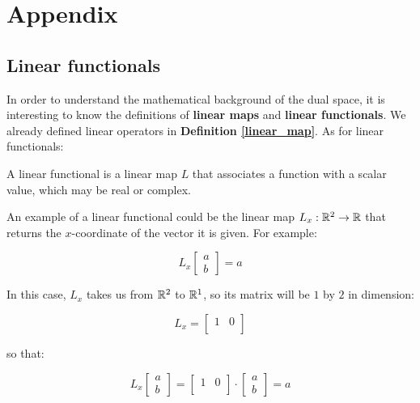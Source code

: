 \section{Appendix}

\subsection{Linear functionals} \label{linfunct}

In order to understand the mathematical background of the dual space, it is interesting to know the definitions of \textbf{linear maps} and \textbf{linear functionals}. We already defined linear operators in \textbf{Definition \ref{linear_map}}. As for linear functionals:

\begin{definition}
    A linear functional is a linear map $L$ that associates a function with a scalar value, which may be real or complex.
\end{definition}

An example of a linear functional could be the linear map $L_x : \mathbb{R}^2 \to \mathbb{R}$ that returns the $x$-coordinate of the vector it is given. For example:

\begin{equation}
    L_x\begin{bmatrix}
        a \\ b
    \end{bmatrix} = a
\end{equation}

In this case, $L_x$ takes us from $\mathbb{R}^2$ to $\mathbb{R}^1$, so its matrix will be $1$ by $2$ in dimension:

\begin{equation}
    L_x = \begin{bmatrix}
        1 & 0 \\
    \end{bmatrix}
\end{equation}

so that:

\begin{equation}
    L_x\begin{bmatrix}
        a \\ b
    \end{bmatrix} =
    \begin{bmatrix}
        1 & 0 \\
    \end{bmatrix}\cdot
    \begin{bmatrix}
        a \\ b
    \end{bmatrix} = a
\end{equation}

